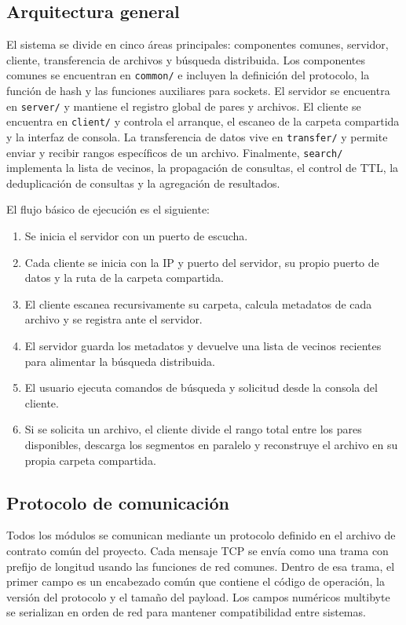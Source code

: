 \documentclass[12pt]{article}
\begin{document}
\subsection{Arquitectura general}

El sistema se divide en cinco áreas principales: componentes comunes,
servidor, cliente, transferencia de archivos y búsqueda distribuida. Los
componentes comunes se encuentran en \texttt{common/} e incluyen la definición
del protocolo, la función de hash y las funciones auxiliares para sockets. El
servidor se encuentra en \texttt{server/} y mantiene el registro global de
pares y archivos. El cliente se encuentra en \texttt{client/} y controla el
arranque, el escaneo de la carpeta compartida y la interfaz de consola. La
transferencia de datos vive en \texttt{transfer/} y permite enviar y recibir
rangos específicos de un archivo. Finalmente, \texttt{search/} implementa la
lista de vecinos, la propagación de consultas, el control de TTL, la
deduplicación de consultas y la agregación de resultados.

El flujo básico de ejecución es el siguiente:

\begin{enumerate}[label=\arabic*.]
    \item Se inicia el servidor con un puerto de escucha.
    \item Cada cliente se inicia con la IP y puerto del servidor, su propio
    puerto de datos y la ruta de la carpeta compartida.
    \item El cliente escanea recursivamente su carpeta, calcula metadatos de
    cada archivo y se registra ante el servidor.
    \item El servidor guarda los metadatos y devuelve una lista de vecinos
    recientes para alimentar la búsqueda distribuida.
    \item El usuario ejecuta comandos de búsqueda y solicitud desde la consola
    del cliente.
    \item Si se solicita un archivo, el cliente divide el rango total entre los
    pares disponibles, descarga los segmentos en paralelo y reconstruye el
    archivo en su propia carpeta compartida.
\end{enumerate}

\subsection{Protocolo de comunicación}

Todos los módulos se comunican mediante un protocolo definido en el archivo de
contrato común del proyecto. Cada mensaje TCP se envía como una trama con
prefijo de longitud usando las funciones de red comunes. Dentro de esa trama,
el primer campo es un encabezado común que contiene el código de operación, la
versión del protocolo y el tamaño del payload. Los campos numéricos multibyte
se serializan en orden de red para mantener compatibilidad entre sistemas.
\end{document}

